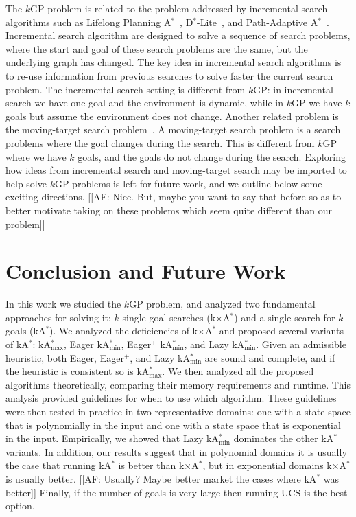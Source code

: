\documentclass[twoside,11pt]{article}
\newcommand{\kgs}{$k$GP\xspace}
\newcommand{\astar}{A$^*$\xspace}
\newcommand{\kastar}{kA$^*$\xspace}
\newcommand{\kastarvar}[1]{\textup{kA}$^*_{#1}$\xspace}
\newcommand{\kastarmin}{\kastarvar{\min}}
\newcommand{\kastarmax}{\kastarvar{\max}}
\newcommand{\kxastar}{k$\times$A$^*$\xspace}
\begin{document}
The \kgs problem is related to the problem addressed by incremental search algorithms such as Lifelong Planning \astar~\cite{koenig2004lifelong}, D$^*$-Lite~\cite{koenig2005fast}, and Path-Adaptive \astar~\cite{hernandez2015reusing}.
Incremental search algorithm are designed to solve a sequence of search problems, where the start and goal of these search problems are the same, but the underlying graph has changed.
The key idea in incremental search algorithms is to re-use information from previous searches to solve faster the current search problem.
The incremental search setting is different from \kgs: in incremental search we have one goal and the environment is dynamic, while in \kgs we have $k$ goals but assume the environment does not change.
Another related problem is the moving-target search problem~\cite{koenig2007speeding,IshidaK1995}.
A moving-target search problem is a search problems where the goal changes during the search.
This is different from \kgs where we have $k$ goals, and the goals do not change during the search.
Exploring how ideas from incremental search and moving-target search may be imported to help solve \kgs problems is left for future work, and we outline below some exciting directions. [[AF: Nice. But, maybe you want to say that before so as to better motivate taking on these problems which seem quite different than our problem]]


\section{Conclusion and Future Work}

In this work we studied the \kgs problem, and analyzed two fundamental approaches for solving it: $k$ single-goal searches (\kxastar) and a single search for $k$ goals (\kastar).
We analyzed the deficiencies of \kxastar and proposed several variants of \kastar: \kastarmax, Eager \kastarmin, Eager$^+$ \kastarmin, and Lazy \kastarmin.
Given an admissible heuristic, both Eager, Eager$^+$, and Lazy \kastarmin are sound and complete, and if the heuristic is consistent so is \kastarmax.
We then analyzed all the proposed algorithms theoretically, comparing their memory requirements and runtime.
This analysis provided guidelines for when to use which algorithm.
These guidelines were then tested in practice in two representative domains: one with a state space that is polynomially in the input and one with a state space that is exponential in the input. Empirically, we showed that Lazy \kastarmin dominates the other \kastar variants.
In addition, our results suggest that in polynomial domains it is usually the case that running \kastar is better than \kxastar, but in exponential domains \kxastar is usually better. [[AF: Usually? Maybe better market the cases where \kastar was better]]
Finally, if the number of goals is very large then running UCS is the best option.
\end{document}
